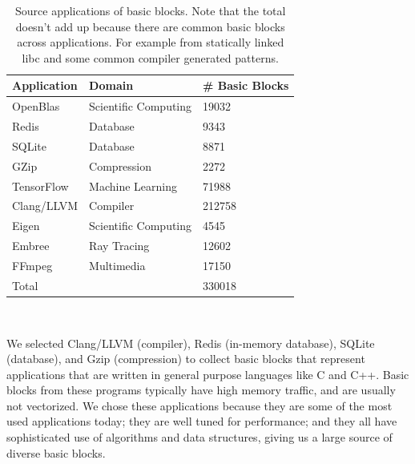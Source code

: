 \begin{table}
\begin{tabular}{|p{}|p{}|p{}|}
\hline
\textbf{Application} & \textbf{Domain} & \textbf{\# Basic Blocks} \\

\hline
OpenBlas & Scientific Computing & 19032 \\

\hline
Redis & Database & 9343  \\

\hline
SQLite & Database & 8871 \\

\hline
GZip & Compression & 2272 \\

\hline
TensorFlow & Machine Learning & 71988 \\

\hline 
Clang/LLVM & Compiler & 212758 \\

\hline
Eigen & Scientific Computing & 4545 \\

\hline
Embree & Ray Tracing & 12602 \\

\hline
FFmpeg & Multimedia & 17150 \\

\hline
\multicolumn{2}{|l|}{Total}  & 330018\\


\hline
\end{tabular}
\\
\caption{Source applications of basic blocks. Note that the total doesn't add up because there are common basic blocks across applications. For example from statically linked libc and some common compiler generated patterns.}
\label{tab:apps}
\end{table}

We selected Clang/LLVM\cite{llvm} (compiler),
Redis (in-memory database), SQLite (database), and Gzip (compression)
to collect basic blocks that represent
applications that are written in general purpose languages
like C and C++.
Basic blocks from these programs
typically have high memory traffic, and are usually not vectorized.
We chose these applications because they are some of the most used
applications today; they are well tuned for performance;
and they all have sophisticated use of algorithms and data structures,
giving us a large source of diverse basic blocks.

